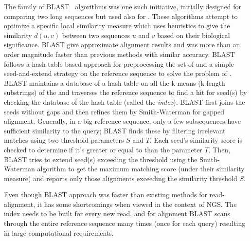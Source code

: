 The family of BLAST~\citep{altschul1990basic, altschul1997gapped} algorithms was one such initiative, initially designed for comparing two long sequences but used also for \ra. These algorithms attempt to optimize a specific local similarity measure which uses heuristics to give the similarity $d(u, v)$ between two sequences $u$ and $v$ based on their biological significance. BLAST give approximate alignment results and was more than an order magnitude faster than previous methods with similar accuracy. BLAST follows a hash table based approach for preprocessing the set of \reads and a simple seed-and-extend strategy on the reference sequence to solve the problem of \ra. BLAST maintains a database of a hash table on all the k-means (k length substrings) of the \reads and traverses the reference sequence to find a hit for seed(s) by checking the database of the hash table (called the \textit{index}). BLAST first joins the seeds without gaps and then refines them by Smith-Waterman for gapped alignment. Generally, in a big reference sequence, only a few subsequences have sufficient similarity to the query; BLAST finds these by filtering irrelevant matches using two threshold parameters $S$ and $T$. Each seed's similarity score is checked to determine if it's greater or equal to than the parameter $T$. Then, BLAST tries to extend seed(s) exceeding the threshold using the Smith-Waterman algorithm to get the maximum matching score (under their similarity measure) and reports only those alignments exceeding the similarity threshold $S$.

Even though BLAST approach was faster than existing methods for read-alignment, it has some shortcomings when viewed in the context of NGS. The index needs to be built for every new read, and for alignment BLAST scans through the entire reference sequence many times (once for each query) resulting in large computational requirements. 


